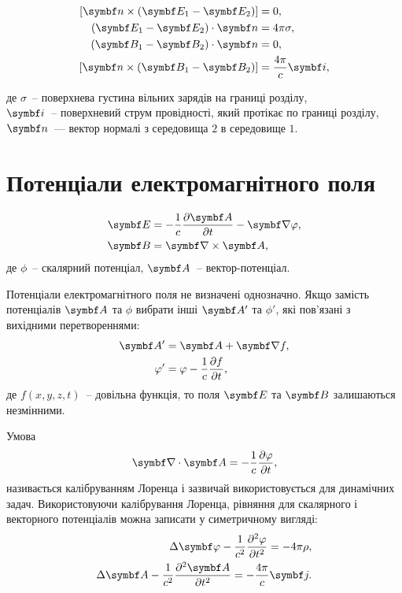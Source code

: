\begin{align}
	\left[ \vect{n} \times (\Efield_{1} - \Efield_{2}) \right] & = 0, \label{EnBc}                        \\
	\left( \Efield_{1} - \Efield_{2}\right) \cdot \vect{n}     & = 4\pi\sigma, \label{EtauBc}             \\
	\left( \Bfield_{1} - \Bfield_{2}\right) \cdot \vect{n}     & = 0,    \label{BnBc}                     \\
	\left[ \vect{n} \times (\Bfield_{1} - \Bfield_{2}) \right] & = \frac{4\pi}{c}\vect{i} \label{BtauBc},
\end{align}

\noindent%
де $\sigma$~-- поверхнева густина вільних зарядів на границі розділу,\\
$\vect{i}$~-- поверхневий струм провідності, який протікає по границі розділу, \\
$\vect{n}$~--- вектор нормалі з середовища $2$  в середовище $1$.

\section{Потенціали електромагнітного поля}

\begin{align}
	\Efield & = -\frac{1}{c}\frac{\partial \vect{A}}{\partial t} - \vect{\nabla}\phi, \label{E=phi+A} \\
	\Bfield & = \rot\vect{A},
\end{align}
де $\phi$~-- скалярний потенціал, $ \vect{A} $~-- вектор-потенціал.

Потенціали електромагнітного поля не визначені однозначно. Якщо замість потенціалів $\vect{A}$ та $\phi$ вибрати інші $\vect{A}'$ та $\phi'$, які пов'язані з вихідними перетвореннями:
\begin{align}
	\vect{A}' & = \vect{A} +\vect{\nabla}f,                     \\
	\phi'     & = \phi - \frac1c \frac{\partial f}{\partial t},
\end{align}
де  $f(x,y,z,t)$~-- довільна функція, то поля $\Efield$ та $\Bfield$ залишаються незмінними.

Умова
\begin{equation}\label{Lorentz_gauge}
	\vect\nabla\cdot\vect{A} = - \frac{1}{c}\frac{\partial\phi}{\partial t},
\end{equation}
називається калібруванням Лоренца і зазвичай використовується для динамічних задач.
Використовуючи калібрування Лоренца, рівняння для скалярного і векторного потенціалів можна записати у симетричному вигляді:
\begin{align}\label{Maxwell_equations_via_potantials}
	\Delta \vect{\phi} - \frac{1}{c^2} \frac{\partial^2 \phi}{\partial t^2} = -4\pi\rho, \\
	\Delta \vect{A} - \frac{1}{c^2} \frac{\partial^2 \vect{A}}{\partial t^2} = - \frac{4\pi}{c}\vect{j}.
\end{align}

